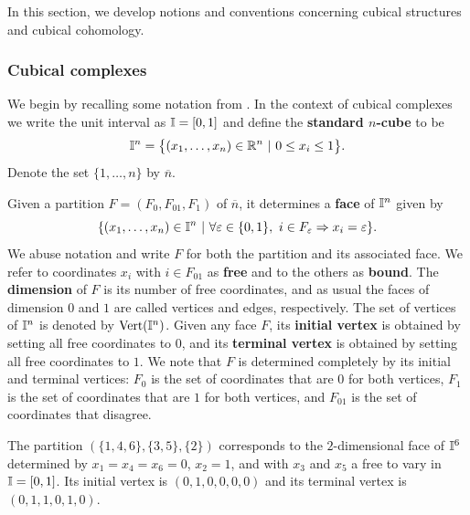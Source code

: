 In this section, we develop notions and conventions concerning cubical structures and cubical cohomology.

\subsubsection{Cubical complexes}
We begin by recalling some notation from \cite{FMS-flows}.
In the context of cubical complexes we write the unit interval as $\mathbb{I} = [0,1]$ and define the \textbf{standard $n$-cube} to be
\begin{equation*}
	\mathbb{I}^n = \big\{ (x_1, \dots, x_n) \in \mathbb{R}^n\ |\ 0 \leq x_i \leq 1 \big\}.
\end{equation*}
Denote the set $\{1, \dots, n\}$ by $\overline{n}$.

Given a partition $F = (F_0, F_{01}, F_1)$ of $\overline n$, it determines a \textbf{face} of $\mathbb{I}^n$ given by
\begin{equation*}
	\{(x_1, \dots, x_n) \in \mathbb{I}^n\ |\ \forall \varepsilon \in \{0, 1\},\ i \in F_\varepsilon \Rightarrow x_i = \varepsilon\}.
\end{equation*}
We abuse notation and write $F$ for both the partition and its associated face.
We refer to coordinates $x_i$ with $i \in F_{01}$ as \textbf{free} and to the others as \textbf{bound}.
The \textbf{dimension} of $F$ is its number of free coordinates, and as usual the faces of dimension $0$ and $1$ are called vertices and edges, respectively.
The set of vertices of $\mathbb{I}^n$ is denoted by ${\rm Vert}(\mathbb{I}^n)$.
Given any face $F$, its \textbf{initial vertex} is obtained by setting all free coordinates to $0$, and its \textbf{terminal vertex} is obtained by setting all free coordinates to $1$.
We note that $F$ is determined completely by its initial and terminal vertices: $F_0$ is the set of coordinates that are $0$ for both vertices, $F_1$ is the set of coordinates that are $1$ for both vertices, and $F_{01}$ is the set of coordinates that disagree.

\begin{example}
	The partition $(\{1,4,6\},\{3,5\}, \{2\})$ corresponds to the $2$-dimensional face of $\mathbb{I}^6$ determined by $x_1=x_4=x_6=0$, $x_2=1$, and with $x_3$ and $x_5$ a free to vary in $\mathbb{I} = [0,1]$.
	Its initial vertex is $(0,1,0,0,0,0)$ and its terminal vertex is $(0,1,1,0,1,0)$.
\end{example}

